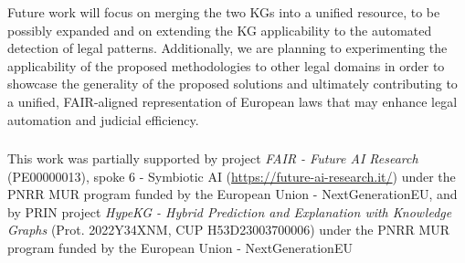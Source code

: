 \documentclass[runningheads]{llncs}
\begin{document}
Future work will focus on merging the two KGs into a unified resource, to be possibly expanded and on extending the KG applicability %
to the automated detection of legal patterns. %
Additionally, we are planning to experimenting the applicability of the proposed methodologies %
to other legal domains in order to showcase the generality of the proposed solutions and ultimately contributing to a unified, FAIR-aligned representation of European laws that may enhance %
legal automation and judicial efficiency.
     

\begin{credits}
    \subsubsection{\ackname}
    This work was partially supported by project \emph{FAIR - Future AI Research} (PE00000013), spoke 6 - Symbiotic AI (\url{https://future-ai-research.it/}) under the PNRR MUR program funded by the European Union - NextGenerationEU, and by PRIN project \emph{HypeKG - Hybrid Prediction and Explanation with Knowledge Graphs} (Prot. 2022Y34XNM, CUP H53D23003700006) under the PNRR MUR program funded by the European Union - NextGenerationEU
\end{credits}
%
%
%



\end{document}
